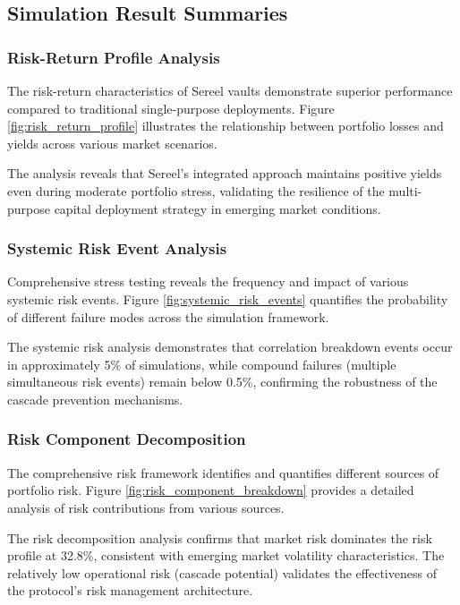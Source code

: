 \documentclass[12pt]{article}
\begin{document}
\subsection{Simulation Result Summaries}

\subsubsection{Risk-Return Profile Analysis}
The risk-return characteristics of Sereel vaults demonstrate superior performance compared to traditional single-purpose deployments. Figure \ref{fig:risk_return_profile} illustrates the relationship between portfolio losses and yields across various market scenarios.

The analysis reveals that Sereel's integrated approach maintains positive yields even during moderate portfolio stress, validating the resilience of the multi-purpose capital deployment strategy in emerging market conditions.

\subsubsection{Systemic Risk Event Analysis}

Comprehensive stress testing reveals the frequency and impact of various systemic risk events. Figure \ref{fig:systemic_risk_events} quantifies the probability of different failure modes across the simulation framework.

The systemic risk analysis demonstrates that correlation breakdown events occur in approximately 5\% of simulations, while compound failures (multiple simultaneous risk events) remain below 0.5\%, confirming the robustness of the cascade prevention mechanisms.

\subsubsection{Risk Component Decomposition}

The comprehensive risk framework identifies and quantifies different sources of portfolio risk. Figure \ref{fig:risk_component_breakdown} provides a detailed analysis of risk contributions from various sources.

The risk decomposition analysis confirms that market risk dominates the risk profile at 32.8\%, consistent with emerging market volatility characteristics. The relatively low operational risk (cascade potential) validates the effectiveness of the protocol's risk management architecture.
\end{document}
